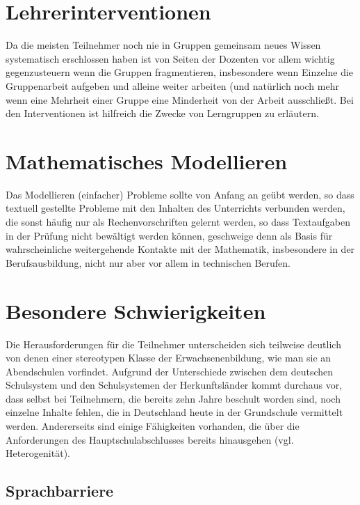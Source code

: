 \documentclass[a4paper]{book}%
\theoremstyle{definition}
\begin{document}
\section{Lehrerinterventionen}

Da die meisten Teilnehmer noch nie in Gruppen gemeinsam neues Wissen systematisch erschlossen haben ist von Seiten der Dozenten vor allem wichtig gegenzusteuern wenn die Gruppen fragmentieren, insbesondere wenn Einzelne die Gruppenarbeit aufgeben und alleine weiter arbeiten (und natürlich noch mehr wenn eine Mehrheit einer Gruppe eine Minderheit von der Arbeit ausschließt. Bei den Interventionen ist hilfreich die Zwecke von Lerngruppen zu erläutern.


\section{Mathematisches Modellieren}

Das Modellieren (einfacher) Probleme sollte von Anfang an geübt werden, so dass textuell gestellte Probleme mit den Inhalten des Unterrichts verbunden werden, die sonst häufig nur als Rechenvorschriften gelernt werden, so dass Textaufgaben in der Prüfung nicht bewältigt werden können, geschweige denn als Basis für wahrscheinliche weitergehende Kontakte mit der Mathematik, insbesondere in der Berufsausbildung, nicht nur aber vor allem in technischen Berufen.


\section{Besondere Schwierigkeiten}

Die Herausforderungen für die Teilnehmer unterscheiden sich teilweise deutlich von denen einer stereotypen Klasse der Erwachsenenbildung, wie man sie an Abendschulen vorfindet. Aufgrund der Unterschiede zwischen dem deutschen Schulsystem und den Schulsystemen der Herkunftsländer kommt durchaus vor, dass selbst bei Teilnehmern, die bereits zehn Jahre beschult worden sind, noch einzelne Inhalte fehlen, die in Deutschland heute in der Grundschule vermittelt werden. Andererseits sind einige Fähigkeiten vorhanden, die über die Anforderungen des Hauptschulabschlusses bereits hinausgehen (vgl. Heterogenität).


\subsection{Sprachbarriere}
\end{document}
